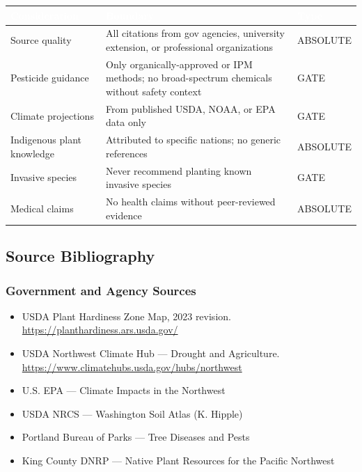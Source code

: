 \documentclass[11pt,letterpaper]{article}
\newcommand{\tableheader}[1]{\textbf{\sffamily\textcolor{white}{#1}}}
\begin{document}
\begin{center}
\begin{tabularx}{\textwidth}{L{3.5cm}XC{2cm}}
\toprule
{}
\tableheader{Consideration} & \tableheader{Boundary} & \tableheader{Type} \\
\midrule
Source quality & All citations from gov agencies, university extension, or professional organizations & ABSOLUTE \\
Pesticide guidance & Only organically-approved or IPM methods; no broad-spectrum chemicals without safety context & GATE \\
Climate projections & From published USDA, NOAA, or EPA data only & GATE \\
Indigenous plant knowledge & Attributed to specific nations; no generic references & ABSOLUTE \\
Invasive species & Never recommend planting known invasive species & GATE \\
Medical claims & No health claims without peer-reviewed evidence & ABSOLUTE \\
\bottomrule
\end{tabularx}
\end{center}

\subsection{Source Bibliography}

\subsubsection{Government and Agency Sources}

\begin{itemize}[leftmargin=2em]
  \item USDA Plant Hardiness Zone Map, 2023 revision. \url{https://planthardiness.ars.usda.gov/}
  \item USDA Northwest Climate Hub --- Drought and Agriculture. \url{https://www.climatehubs.usda.gov/hubs/northwest}
  \item U.S. EPA --- Climate Impacts in the Northwest
  \item USDA NRCS --- Washington Soil Atlas (K. Hipple)
  \item Portland Bureau of Parks --- Tree Diseases and Pests
  \item King County DNRP --- Native Plant Resources for the Pacific Northwest
\end{itemize}
\end{document}
